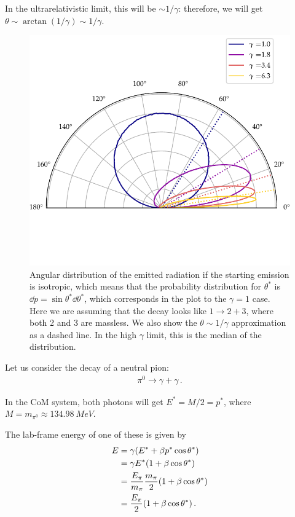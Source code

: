 \documentclass[main.tex]{subfiles}
\begin{document}
In the ultrarelativistic limit, this will be \(\sim 1/ \gamma \): therefore, we will get \(\theta \sim \arctan (1 / \gamma ) \sim 1/ \gamma \).

\begin{figure}[ht]
\centering
\includegraphics[width=\textwidth]{figures/angular_distribution_shift}
\caption{Angular distribution of the emitted radiation if the starting emission is isotropic, which means that the probability distribution for \(\theta^{*} \) is \(\dd{p} = \sin \theta^{*} \dd{\theta^{*} }\), which corresponds in the plot to the \(\gamma = 1\) case. Here we are assuming that the decay looks like \(1 \to 2 +3 \), where both 2 and 3 are massless.
We also show the \(\theta \sim 1/\gamma \) approximation as a dashed line. In the high \(\gamma \) limit, this is the median of the distribution.}
\label{fig:angular_distribution_shift}
\end{figure}

Let us consider the decay of a neutral pion: 
%
\begin{align}
\pi^{0} \to \gamma + \gamma 
\,.
\end{align}

In the CoM system, both photons will get \(E^{*} = M/2 = p^{*}\), where \(M = m_{\pi^{0}} \approx \SI{134.98}{MeV}\).

The lab-frame energy of one of these is given by 
%
\begin{subequations}
\begin{align}
E &= \gamma \qty(E^{*} + \beta p^{*} \cos \theta^{*})\\
 &= \gamma E^{*} ( 1 + \beta \cos \theta^{*})  \\
 &= \frac{E_\pi }{m_\pi } \frac{m_\pi}{2} \qty(1 + \beta \cos \theta^{*})  \\
 &= \frac{E_\pi }{2} \qty(1 + \beta \cos \theta^{*})
\,.
\end{align}
\end{subequations}
\end{document}
